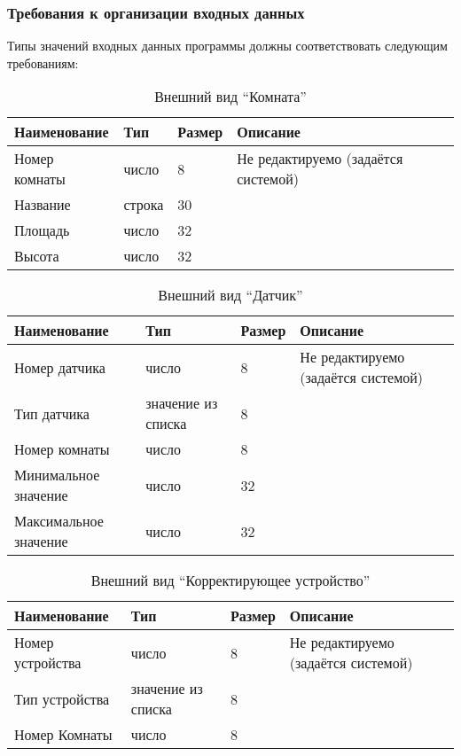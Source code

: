     \subsubsection{Требования к организации входных данных}
      Типы значений входных данных программы должны соответствовать следующим требованиям:
          \begin{table}[h!]
            \centering
            \caption{Внешний вид “Комната”}
            \label{room:size}
            \begin{tabular}{|l|l|l|l|}
            \hline
            Наименование & Тип & Размер & Описание \\ \hline
            Номер комнаты & число & 8 & Не редактируемо (задаётся системой) \\ \hline
            Название  & строка & 30 & \\ \hline
            Площадь  & число & 32 &  \\ \hline
            Высота    & число & 32 & \\ \hline
            \end{tabular}
          \end{table}
          \begin{table}[h!]
            \centering
            \caption{Внешний вид “Датчик”}
            \label{sensor:size}
            \begin{tabular}{|l|l|l|l|}
            \hline
            Наименование & Тип & Размер & Описание \\ \hline
            Номер датчика & число & 8 & Не редактируемо (задаётся системой)\\ \hline
            Тип датчика  & значение из списка & 8 & \\ \hline
            Номер комнаты   & число & 8 & \\ \hline
            Минимальное значение & число & 32 & \\ \hline
            Максимальное значение & число & 32 & \\ \hline
            \end{tabular}
          \end{table}
          \begin{table}[h!]
            \centering
            \caption{Внешний вид “Корректирующее устройство”}
            \label{sensor:size}
            \begin{tabular}{|l|l|l|l|}
            \hline
            Наименование & Тип & Размер & Описание \\ \hline
            Номер устройства & число & 8 & Не редактируемо (задаётся системой) \\ \hline
            Тип устройства & значение из списка & 8 & \\ \hline
            Номер Комнаты & число & 8 & \\ \hline
            \end{tabular}
          \end{table}
          
